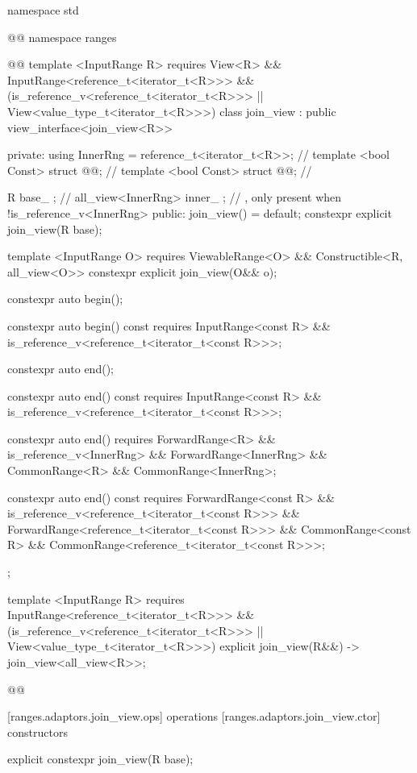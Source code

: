 \begin{codeblock}
namespace std { @@ namespace ranges { @@
  template <InputRange R>
      requires View<R> && InputRange<reference_t<iterator_t<R>>> &&
          (is_reference_v<reference_t<iterator_t<R>>> ||
          View<value_type_t<iterator_t<R>>>)
  class join_view : public view_interface<join_view<R>> {
  private:
    using InnerRng = reference_t<iterator_t<R>>; // \expos
    template <bool Const>
      struct @@; // \expos
    template <bool Const>
      struct @@; // \expos

    R base_ {}; // \expos
    all_view<InnerRng> inner_ {}; // \expos, only present when !is_reference_v<InnerRng>
  public:
    join_view() = default;
    constexpr explicit join_view(R base);

    template <InputRange O>
        requires ViewableRange<O> && Constructible<R, all_view<O>>
      constexpr explicit join_view(O&& o);

    constexpr auto begin();

    constexpr auto begin() const requires InputRange<const R> &&
        is_reference_v<reference_t<iterator_t<const R>>>;

    constexpr auto end();

    constexpr auto end() const requires InputRange<const R> &&
        is_reference_v<reference_t<iterator_t<const R>>>;

    constexpr auto end() requires ForwardRange<R> &&
        is_reference_v<InnerRng> && ForwardRange<InnerRng> &&
        CommonRange<R> && CommonRange<InnerRng>;

    constexpr auto end() const requires ForwardRange<const R> &&
        is_reference_v<reference_t<iterator_t<const R>>> &&
        ForwardRange<reference_t<iterator_t<const R>>> &&
        CommonRange<const R> && CommonRange<reference_t<iterator_t<const R>>>;
  };

  template <InputRange R>
      requires InputRange<reference_t<iterator_t<R>>> &&
          (is_reference_v<reference_t<iterator_t<R>>> ||
          View<value_type_t<iterator_t<R>>>)
    explicit join_view(R&&) -> join_view<all_view<R>>;
}}@\removed{\}\}}@
\end{codeblock}

[ranges.adaptors.join_view.ops]{ operations}
[ranges.adaptors.join_view.ctor]{ constructors}

%
\begin{itemdecl}
explicit constexpr join_view(R base);
\end{itemdecl}

